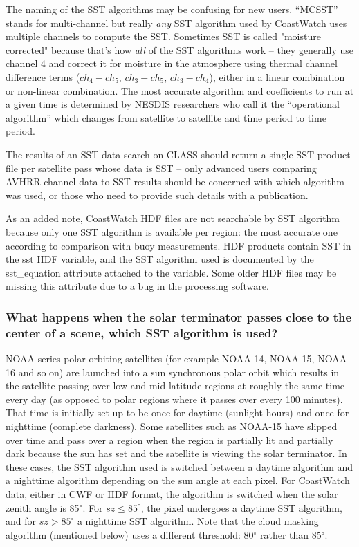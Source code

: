 The naming of the SST algorithms may be confusing for new users.
``MCSST'' stands for multi-channel but really {\em any} SST algorithm
used by CoastWatch uses multiple channels to compute the SST.
Sometimes SST is called "moisture corrected" because that's how {\em
all} of the SST algorithms work -- they generally use channel 4 and
correct it for moisture in the atmosphere using thermal channel
difference terms ($ch_4 - ch_5$, $ch_3 - ch_5$, $ch_3 - ch_4$), either
in a linear combination or non-linear combination.  The most accurate
algorithm and coefficients to run at a given time is determined by
NESDIS researchers who call it the ``operational algorithm'' which
changes from satellite to satellite and time period to time period.

The results of an SST data search on CLASS should return a single SST
product file per satellite pass whose data is SST -- only advanced
users comparing AVHRR channel data to SST results should be concerned
with which algorithm was used, or those who need to provide such
details with a publication.

As an added note, CoastWatch HDF files are not searchable by SST
algorithm because only one SST algorithm is available per region: the
most accurate one according to comparison with buoy measurements.  HDF
products contain SST in the {\file sst} HDF variable, and the SST
algorithm used is documented by the {\file sst\_equation} attribute
attached to the variable.  Some older HDF files may be missing this
attribute due to a bug in the processing software.

\subsubsection*{What happens when the solar terminator passes close to the center of a scene, which SST algorithm is used?}

NOAA series polar orbiting satellites (for example NOAA-14,
NOAA-15, NOAA-16 and so on) are launched into a sun synchronous polar
orbit which results in the satellite passing over low and mid latitude
regions at roughly the same time every day (as opposed to polar
regions where it passes over every 100 minutes).  That time is
initially set up to be once for daytime (sunlight hours) and once for
nighttime (complete darkness).  Some satellites such as NOAA-15 have
slipped over time and pass over a region when the region is partially
lit and partially dark because the sun has set and the satellite is
viewing the solar terminator.  In these cases, the SST algorithm used
is switched between a daytime algorithm and a nighttime algorithm
depending on the sun angle at each pixel.  For CoastWatch data, either
in CWF or HDF format, the algorithm is switched when the solar zenith
angle is 85$^{\circ}$.  For $sz \leq 85^{\circ}$, the pixel undergoes a
daytime SST algorithm, and for $sz > 85^{\circ}$ a nighttime SST
algorithm.  Note that the cloud masking algorithm (mentioned below)
uses a different threshold: 80$^{\circ}$ rather than 85$^{\circ}$.

